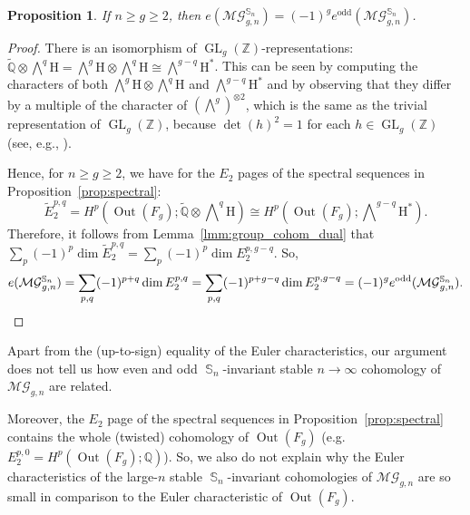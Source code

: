 \documentclass[oneside]{amsart}
\newtheorem{proposition}[theorem]{Proposition}
\theoremstyle{remark}
\newcommand{\Q}{\mathbb{Q}}
\newcommand{\Z}{\mathbb{Z}}
\newcommand{\tQ}{\widetilde{\Q}}
\DeclareMathOperator{\SG}{{\mathbb S}}
\newcommand{\GL}{{\operatorname{GL}}}
\newcommand{\Out}{{\operatorname{Out}}}
\newcommand{\MG}{\mathcal{MG}}
\begin{document}
\begin{proposition}
\label{prop:oddeven}
If $n \geq g \geq 2$, then $e(\MG_{g,n}^{\SG_n}) = (-1)^g e^\mathrm{odd}(\MG_{g,n}^{\SG_n})$.
\end{proposition}
\begin{proof}
There is an isomorphism of $\GL_{g}(\Z)$-representations: 
$\tQ \otimes \bigwedge\nolimits^{q} \mathrm H = \bigwedge\nolimits^{g} \mathrm H \otimes \bigwedge\nolimits^{q} \mathrm H \cong \bigwedge\nolimits^{g-q} \mathrm H^*$.
This can be seen by computing the characters of both 
$\bigwedge\nolimits^{g}\mathrm H \otimes \bigwedge\nolimits^{q} \mathrm H$ and $\bigwedge\nolimits^{g-q} \mathrm H^*$
and by observing that they differ by a multiple of the  character of $(\bigwedge\nolimits^{g})^{\otimes2}$,
which is the same as the trivial representation of $\GL_g(\Z)$, because $\det(h)^2 = 1$ for each $h\in \GL_g(\Z)$ (see, e.g., \cite[Ch.~7.A.2]{stanley1997enumerative2}).

Hence, for $n \geq g \geq 2$, we have for the $E_2$ pages of the spectral sequences in Proposition~\ref{prop:spectral}:
$$\widetilde E_2^{p,q} = H^{p}\left(\Out(F_g);\tQ \otimes \bigwedge\nolimits^q \mathrm H\right)
\cong 
H^{p}\left(\Out(F_g);\bigwedge\nolimits^{g-q} \mathrm H^*\right).
$$
Therefore, it follows from Lemma~\ref{lmm:group_cohom_dual} that $\sum_p (-1)^p \dim \widetilde E_2^{p,q} = \sum_p (-1)^p \dim E_2^{p,g-q}$.
So,
%
\begin{gather*} e(\MG_{g,n}^{\SG_n}) = \sum_{p,q} (-1)^{p+q} \dim E_2^{p,q} = \sum_{p,q} (-1)^{p+g-q} \dim E_2^{p,g-q} = (-1)^g e^\mathrm{odd}(\MG_{g,n}^{\SG_n}). \qedhere \end{gather*}
\end{proof}
Apart from the (up-to-sign) equality of the Euler characteristics, our argument does not tell us how even and odd $\SG_n$-invariant stable $n\rightarrow \infty$ cohomology of $\MG_{g,n}$ are related.

Moreover, the $E_2$ page of the spectral sequences in Proposition~\ref{prop:spectral} contains the whole (twisted) cohomology of $\Out(F_g)$ (e.g.~
 $E_2^{p,0} = H^p(\Out(F_g);\Q)$).
So, we also do not explain why the Euler characteristics of the large-$n$ stable  $\SG_n$-invariant cohomologies of $\MG_{g,n}$ are so small
in comparison to the Euler characteristic of $\Out(F_g)$.

%

%
%

%
%
%
%
%
%
%
%
%
%
%
%

%
%
%
%
%
\end{document}
